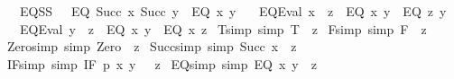 \begin{isabellebody}
\ \ {\isacharbar}{\kern0pt}\ EQ{\isacharunderscore}{\kern0pt}SS{\isacharcolon}{\kern0pt}\ \ \ {\isachardoublequoteopen}EQ\ {\isacharparenleft}{\kern0pt}Succ\ x{\isacharparenright}{\kern0pt}\ {\isacharparenleft}{\kern0pt}Succ\ y{\isacharparenright}{\kern0pt}\ {\isasymRrightarrow}\ EQ\ x\ y{\isachardoublequoteclose}\isanewline
\ \ {\isacharbar}{\kern0pt}\ EQ{\isacharunderscore}{\kern0pt}Eval{}{\isacharcolon}{\kern0pt}\ {\isachardoublequoteopen}x\ {\isasymRrightarrow}\ z\ {\isasymLongrightarrow}\ EQ\ x\ y\ {\isasymRrightarrow}\ EQ\ z\ y{\isachardoublequoteclose}\isanewline
\ \ {\isacharbar}{\kern0pt}\ EQ{\isacharunderscore}{\kern0pt}Eval{}{\isacharcolon}{\kern0pt}\ {\isachardoublequoteopen}y\ {\isasymRrightarrow}\ z\ {\isasymLongrightarrow}\ EQ\ x\ y\ {\isasymRrightarrow}\ EQ\ x\ z{\isachardoublequoteclose}\isanewline
\isanewline
{}\isamarkupfalse%
\ T{\isacharunderscore}{\kern0pt}simp\ {\isacharbrackleft}{\kern0pt}simp{\isacharbrackright}{\kern0pt}{\isacharcolon}{\kern0pt}\ {\isachardoublequoteopen}T\ {\isasymRrightarrow}\ z{\isachardoublequoteclose}\isanewline
{}\isamarkupfalse%
\ F{\isacharunderscore}{\kern0pt}simp\ {\isacharbrackleft}{\kern0pt}simp{\isacharbrackright}{\kern0pt}{\isacharcolon}{\kern0pt}\ {\isachardoublequoteopen}F\ {\isasymRrightarrow}\ z{\isachardoublequoteclose}\isanewline
{}\isamarkupfalse%
\ Zero{\isacharunderscore}{\kern0pt}simp\ {\isacharbrackleft}{\kern0pt}simp{\isacharbrackright}{\kern0pt}{\isacharcolon}{\kern0pt}\ {\isachardoublequoteopen}Zero\ {\isasymRrightarrow}\ z{\isachardoublequoteclose}\isanewline
{}\isamarkupfalse%
\ Succ{\isacharunderscore}{\kern0pt}simp\ {\isacharbrackleft}{\kern0pt}simp{\isacharbrackright}{\kern0pt}{\isacharcolon}{\kern0pt}\ {\isachardoublequoteopen}Succ\ x\ {\isasymRrightarrow}\ z{\isachardoublequoteclose}\isanewline
{}\isamarkupfalse%
\ IF{\isacharunderscore}{\kern0pt}simp\ {\isacharbrackleft}{\kern0pt}simp{\isacharbrackright}{\kern0pt}{\isacharcolon}{\kern0pt}\ {\isachardoublequoteopen}IF\ p\ x\ y\ {\isasymRrightarrow}\ \ z{\isachardoublequoteclose}\isanewline
{}\isamarkupfalse%
\ EQ{\isacharunderscore}{\kern0pt}simp\ {\isacharbrackleft}{\kern0pt}simp{\isacharbrackright}{\kern0pt}{\isacharcolon}{\kern0pt}\ {\isachardoublequoteopen}EQ\ x\ y\ {\isasymRrightarrow}\ z{\isachardoublequoteclose}\isanewline

\end{isabellebody}
